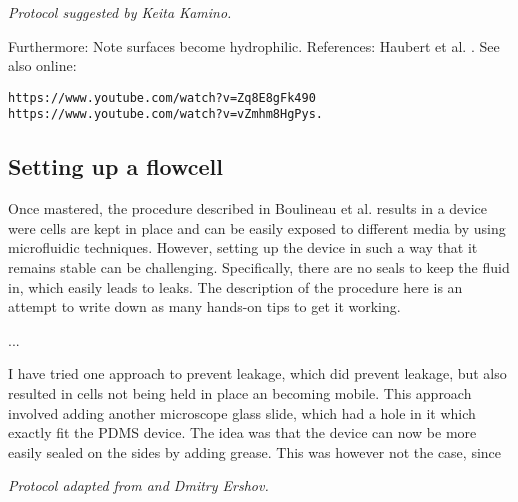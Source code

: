 \hfill \textit{Protocol suggested by Keita Kamino.}    

\hfill

Furthermore: Note surfaces become hydrophilic. References: Haubert et al. \cite{Haubert2006}. See also online:
\begin{verbatim}
https://www.youtube.com/watch?v=Zq8E8gFk490 
https://www.youtube.com/watch?v=vZmhm8HgPys.
\end{verbatim}


\newpage

\subsection*{Setting up a flowcell}

Once mastered, the procedure described in Boulineau et al. \cite{Boulineau2013} results in a device were cells are kept in place and can be easily exposed to different media by using microfluidic techniques. However, setting up the device in such a way that it remains stable can be challenging. Specifically, there are no seals to keep the fluid in, which easily leads to leaks. 
The description of the procedure here is an attempt to write down as many hands-on tips to get it working. 

\begin{compactitem}
    \item ...
\end{compactitem}

I have tried one approach to prevent leakage, which did prevent leakage, but also resulted in cells not being held in place an becoming mobile.
This approach involved adding another microscope glass slide, which had a hole in it which exactly fit the PDMS device. The idea was that the device can now be more easily sealed on the sides by adding grease. This was however not the case, since 

\hfill \textit{Protocol adapted from \cite{Boulineau2013} and Dmitry Ershov.}    








    
